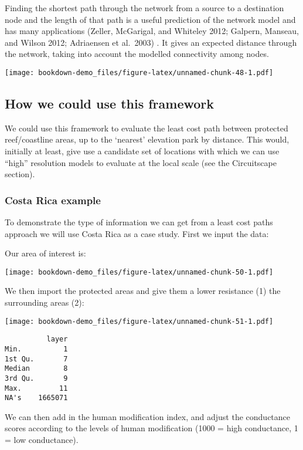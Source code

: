 \documentclass[
]{book}
\begin{document}
Finding the shortest path through the network from a source to a destination node and the length of that path is a useful prediction of the network model and has many applications (Zeller, McGarigal, and Whiteley 2012; Galpern, Manseau, and Wilson 2012; Adriaensen et al.~2003) . It gives an expected distance through the network, taking into account the modelled connectivity among nodes.

\texttt{[image: bookdown-demo\_files/figure-latex/unnamed-chunk-48-1.pdf]}

\hypertarget{how-we-could-use-this-framework}{%
\subsection{How we could use this framework}\label{how-we-could-use-this-framework}}

We could use this framework to evaluate the least cost path between protected reef/coastline areas, up to the `nearest' elevation park by distance. This would, initially at least, give use a candidate set of locations with which we can use ``high'' resolution models to evaluate at the local scale (see the Circuitscape section).

\hypertarget{costa-rica-example}{%
\subsubsection{Costa Rica example}\label{costa-rica-example}}

To demonstrate the type of information we can get from a least cost paths approach we will use Costa Rica as a case study. First we input the data:

Our area of interest is:

\texttt{[image: bookdown-demo\_files/figure-latex/unnamed-chunk-50-1.pdf]}

We then import the protected areas and give them a lower resistance (1) the surrounding areas (2):

\texttt{[image: bookdown-demo\_files/figure-latex/unnamed-chunk-51-1.pdf]}

\begin{verbatim}
          layer
Min.          1
1st Qu.       7
Median        8
3rd Qu.       9
Max.         11
NA's    1665071
\end{verbatim}

We can then add in the human modification index, and adjust the conductance scores according to the levels of human modification (1000 = high conductance, 1 = low conductance).
\end{document}

